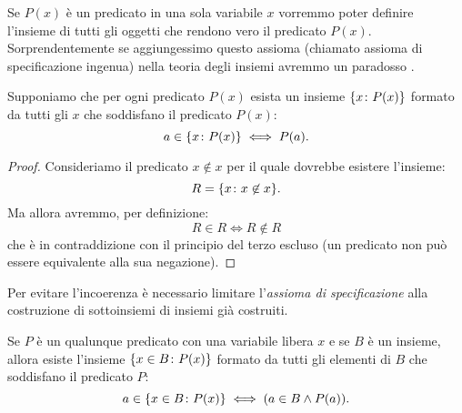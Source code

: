 Se $P(x)$ è un predicato in una sola variabile $x$ vorremmo poter
definire l'insieme di tutti gli oggetti che rendono vero il predicato $P(x)$.
Sorprendentemente se aggiungessimo questo assioma 
(chiamato assioma di specificazione ingenua) nella teoria degli insiemi
avremmo un paradosso%
%
%
%
%
%
.

\begin{theorem}
Supponiamo che per ogni predicato $P(x)$ esista un insieme 
${\left\{ x\colon P(x) \right\}}$ formato da tutti gli $x$ 
che soddisfano il predicato $P(x)$:
\[
  a \in {\left\{ x\colon P(x) \right\}} \iff P(a).
\]
\end{theorem}
%
\begin{proof}
  Consideriamo il predicato $x \not \in x$
  per il quale dovrebbe esistere l'insieme:
  \[
    R = {\left\{ x\colon x\not \in x \right\}}.  
  \]
  Ma allora avremmo, per definizione:
  \[
    R \in R 
    \iff R\not \in R
  \]
  che è in contraddizione con il principio del terzo escluso
  (un predicato non può essere equivalente alla sua negazione).
\end{proof}

Per evitare l'incoerenza è necessario limitare l'\emph{assioma di specificazione}
alla costruzione di sottoinsiemi di insiemi già costruiti.

\begin{axiom}[specificazione]
  Se $P$ è un qualunque predicato con una variabile libera $x$
  e se $B$ è un insieme, allora esiste l'insieme 
  ${\left\{ x\in B\colon P(x) \right\}}$ formato 
  da tutti gli elementi di $B$ che soddisfano il predicato $P$:
\[
  a \in {\left\{ x\in B\colon P(x) \right\}} \iff (a \in B \land P(a)).
\]
\end{axiom}


